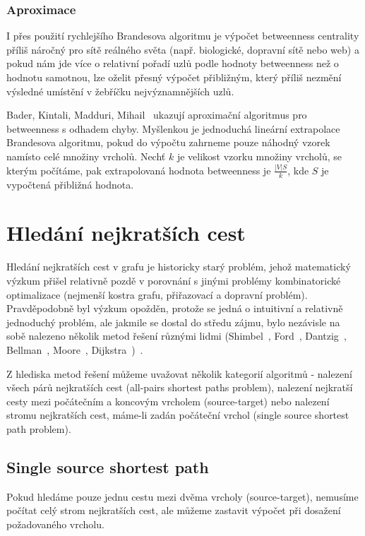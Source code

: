 \documentclass{bakalarka}
\begin{document}
\subsubsection{Aproximace}
I přes použití rychlejšího Brandesova algoritmu je výpočet betweenness
centrality příliš náročný pro sítě reálného světa (např. biologické, dopravní
sítě nebo web) a pokud nám jde více o relativní pořadí uzlů podle hodnoty
betweenness než o hodnotu samotnou, lze oželit přesný výpočet přibližným, který
příliš nezmění výsledné umístění v žebříčku nejvýznamnějších uzlů.

Bader, Kintali, Madduri, Mihail~\citep{bkmm2007} ukazují aproximační algoritmus
pro betweenness s odhadem chyby.  Myšlenkou je jednoduchá lineární extrapolace
Brandesova algoritmu, pokud do výpočtu zahrneme pouze náhodný vzorek namísto
celé množiny vrcholů. Nechť $k$ je velikost vzorku množiny vrcholů, se kterým
počítáme, pak extrapolovaná hodnota betweenness je $\frac{|V| S}{k}$, kde $S$
je vypočtená přibližná hodnota.


\section{Hledání nejkratších cest}
Hledání nejkratších cest v grafu je historicky starý problém, jehož matematický
výzkum přišel relativně pozdě v porovnání s jinými problémy kombinatorické
optimalizace (nejmenší kostra grafu, přiřazovací a dopravní problém).
Pravděpodobně byl výzkum opožděn, protože se jedná o intuitivní a relativně
jednoduchý problém, ale jakmile se dostal do středu zájmu, bylo nezávisle na
sobě nalezeno několik metod řešení různými lidmi (Shimbel~\citep{shimbel1955},
Ford~\citep{ford1956}, Dantzig~\citep{dantzig1957},
Bellman~\citep{bellmanford_algorithm}, Moore~\citep{moore1959},
Dijkstra~\citep{dijkstra1959})~\citep{schrijver2012}.


Z hlediska metod řešení můžeme uvažovat několik kategorií algoritmů - nalezení
všech párů nejkratších cest (all-pairs shortest paths problem), nalezení
nejkratší cesty mezi počátečním a koncovým vrcholem (source-target) nebo
nalezení stromu nejkratších cest, máme-li zadán počáteční vrchol (single source
shortest path problem).


\subsection{Single source shortest path}
Pokud hledáme pouze jednu cestu mezi dvěma vrcholy (source-target), nemusíme
počítat celý strom nejkratších cest, ale můžeme zastavit výpočet při dosažení
požadovaného vrcholu. 
\end{document}
